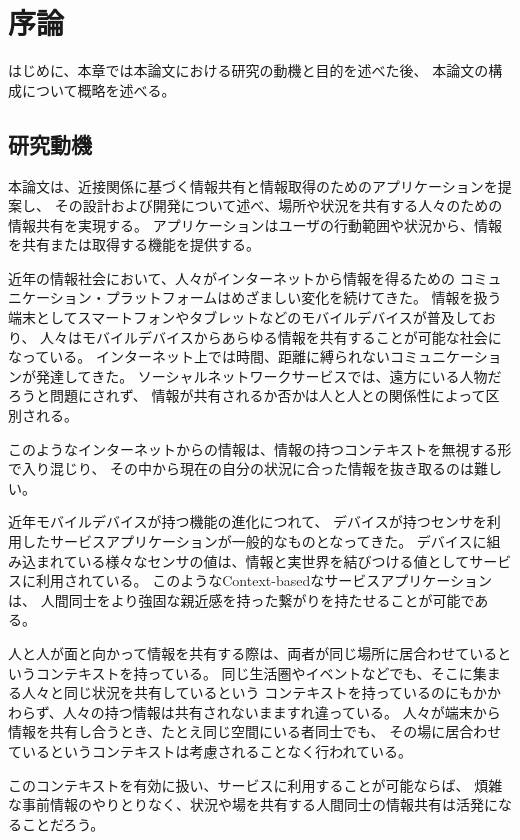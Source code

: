 \chapter{序論}\label{chap:introduction}

はじめに、本章では本論文における研究の動機と目的を述べた後、
本論文の構成について概略を述べる。

\newpage

\section{研究動機}

本論文は、近接関係に基づく情報共有と情報取得のためのアプリケーションを提案し、
その設計および開発について述べ、場所や状況を共有する人々のための情報共有を実現する。
アプリケーションはユーザの行動範囲や状況から、情報を共有または取得する機能を提供する。

近年の情報社会において、人々がインターネットから情報を得るための
コミュニケーション・プラットフォームはめざましい変化を続けてきた。
情報を扱う端末としてスマートフォンやタブレットなどのモバイルデバイスが普及しており、
人々はモバイルデバイスからあらゆる情報を共有することが可能な社会になっている。
インターネット上では時間、距離に縛られないコミュニケーションが発達してきた。
ソーシャルネットワークサービスでは、遠方にいる人物だろうと問題にされず、
情報が共有されるか否かは人と人との関係性によって区別される。

このようなインターネットからの情報は、情報の持つコンテキストを無視する形で入り混じり、
その中から現在の自分の状況に合った情報を抜き取るのは難しい。

近年モバイルデバイスが持つ機能の進化につれて、
デバイスが持つセンサを利用したサービスアプリケーションが一般的なものとなってきた。
デバイスに組み込まれている様々なセンサの値は、情報と実世界を結びつける値としてサービスに利用されている。
このようなContext-basedなサービスアプリケーションは、
人間同士をより強固な親近感を持った繋がりを持たせることが可能である。

人と人が面と向かって情報を共有する際は、両者が同じ場所に居合わせているというコンテキストを持っている。
同じ生活圏やイベントなどでも、そこに集まる人々と同じ状況を共有しているという
コンテキストを持っているのにもかかわらず、人々の持つ情報は共有されないまますれ違っている。
人々が端末から情報を共有し合うとき、たとえ同じ空間にいる者同士でも、
その場に居合わせているというコンテキストは考慮されることなく行われている。

このコンテキストを有効に扱い、サービスに利用することが可能ならば、
煩雑な事前情報のやりとりなく、状況や場を共有する人間同士の情報共有は活発になることだろう。

